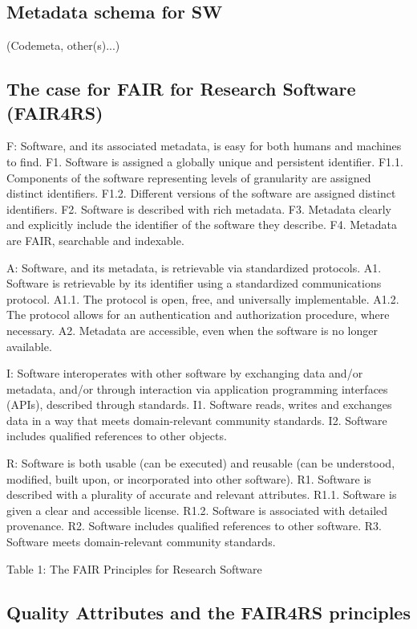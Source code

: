 \subsection{Metadata schema for SW}

(Codemeta, other(s)...)

\subsection{The case for FAIR for Research Software (FAIR4RS)}

F: Software, and its associated metadata, is easy for both humans and machines to find.
F1. Software is assigned a globally unique and persistent identifier.
F1.1. Components of the software representing levels of granularity are assigned distinct identifiers.
F1.2. Different versions of the software are assigned distinct identifiers.
F2. Software is described with rich metadata.
F3. Metadata clearly and explicitly include the identifier of the software they describe.
F4. Metadata are FAIR, searchable and indexable.

A: Software, and its metadata, is retrievable via standardized protocols.
A1. Software is retrievable by its identifier using a standardized communications protocol.
A1.1. The protocol is open, free, and universally implementable.
A1.2. The protocol allows for an authentication and authorization procedure, where necessary.
A2. Metadata are accessible, even when the software is no longer available.

I: Software interoperates with other software by exchanging data and/or metadata, and/or
through interaction via application programming interfaces (APIs), described through
standards.
I1. Software reads, writes and exchanges data in a way that meets domain-relevant community standards.
I2. Software includes qualified references to other objects.

R: Software is both usable (can be executed) and reusable (can be understood, modified, built
upon, or incorporated into other software).
R1. Software is described with a plurality of accurate and relevant attributes.
R1.1. Software is given a clear and accessible license.
R1.2. Software is associated with detailed provenance.
R2. Software includes qualified references to other software.
R3. Software meets domain-relevant community standards.

Table 1: The FAIR Principles for Research Software


\subsection{Quality Attributes and the FAIR4RS principles}



